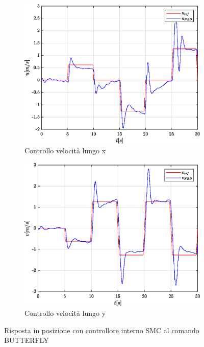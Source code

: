 \begin{figure}
	\\
	\begin{subfigure}{0.45\textwidth}
		\centering
		\includegraphics[width=1\textwidth]{Simulazioni/Figure/SMC/BUTTERFLY/PositionControlXVel}
		\caption{Controllo velocità lungo x}
	\end{subfigure}
	\hfill
	\begin{subfigure}{0.45\textwidth}
		\centering
		\includegraphics[width=1\textwidth]{Simulazioni/Figure/SMC/BUTTERFLY/PositionControlYVel}
		\caption{Controllo velocità lungo y}
	\end{subfigure}
	\caption{Risposta in posizione con controllore interno SMC al comando BUTTERFLY}
\end{figure}

